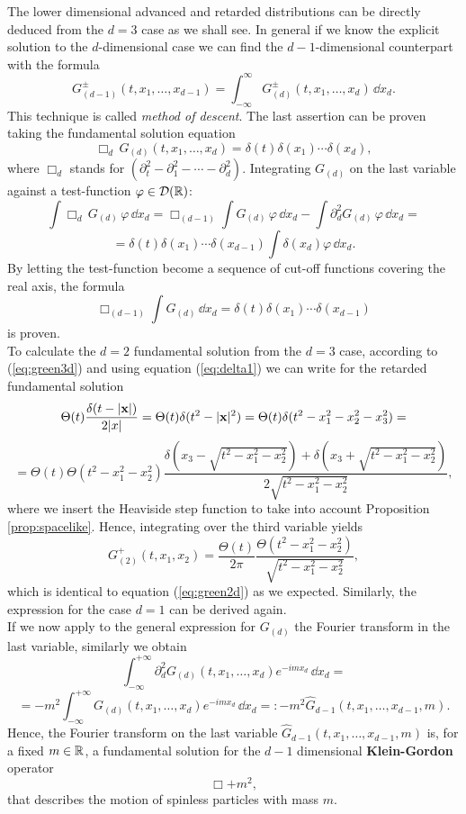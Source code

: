 	\noindent \normalsize The lower dimensional advanced and retarded distributions can be directly deduced from the $d=3$ case as we shall see. In general if we know the explicit solution to the $d$-dimensional case we can find the $d-1$-dimensional counterpart with the formula
	\[	G_{(d-1)}^{\pm}(t,x_1,\dots,x_{d-1})=\int_{-\infty}^{\infty}G_{(d)}^{\pm}(t,x_1,\dots,x_d)\,\dd x_{d}.	\]
	This technique is called \emph{method of descent}.
	The last assertion can be proven taking the fundamental solution equation
	\[\Box_d\, G_{(d)}(t,x_1,\dots,x_d)=\delta(t)\delta(x_1)\cdots\delta(x_d),\]
	where $\Box_d$ stands for $(\partial_t^2-\partial_1^2-\cdots-\partial_{d}^2)$. Integrating $G_{(d)}$ on the last variable against a test-function $\varphi\in\mathcal{D}({\mathbb R})$:
	\[	\int \Box_d\, G_{(d)}\,\varphi\,\dd x_d=	 \Box_{(d-1)}\int G_{(d)}\,\varphi\,\dd x_d-\int \partial_d^2 G_{(d)}\,\varphi\,\dd x_d=\] \[=\delta(t)\delta(x_1)\cdots\delta(x_{d-1})\int\delta(x_d)\varphi\,\dd x_d.	\]
	By letting the test-function become a sequence of cut-off functions covering the real axis, the formula
	\[	\Box_{(d-1)}\int G_{(d)}\,\dd x_d=\delta(t)\delta(x_1)\cdots\delta(x_{d-1})		\] is proven.\\
	To calculate the $d=2$ fundamental solution from the $d=3$ case, according to (\ref{eq:green3d}) and using equation (\ref{eq:delta1}) we can write for the retarded fundamental solution
	\[ \Theta(t)\frac{\delta(t-|\mathbf{x}|)}{2|x|}=\Theta(t)\delta(t^2-|\mathbf{x}|^2)=\Theta(t)\delta(t^2-x_1^2-x_2^2-x_3^2)=\] \[=\Theta(t)\Theta(t^2-x_1^2-x_2^2)\frac{\delta(x_3-\sqrt{t^2-x_1^2-x_2^2})+\delta(x_3+\sqrt{t^2-x_1^2-x_2^2})}{2\sqrt{t^2-x_1^2-x_2^2}},	\]
	where we insert the Heaviside step function to take into account Proposition \ref{prop:spacelike}. Hence, integrating over the third variable yields
	\[	G_{(2)}^{+}(t,x_1,x_2)=\frac{\Theta(t)}{2\pi}\frac{\Theta(t^2-x_1^2-x_2^2)}{\sqrt{t^2-x_1^2-x_2^2}}	,	\]
	which is identical to equation (\ref{eq:green2d}) as we expected. Similarly, the expression for the case $d=1$ can be derived again.\\
	
	If we now apply to the general expression for $G_{(d)}$ the Fourier transform in the last variable, similarly we obtain
	\[	\int_{-\infty}^{+\infty}\partial_d^2 G_{(d)}(t,x_1,\dots,x_d)e^{-im x_d}\,\dd x_d=\] \[=-m^2\int_{-\infty}^{+\infty} G_{(d)}(t,x_1,\dots,x_d)e^{-im x_d}\,\dd x_d=:-m^2\hat{G}_{d-1}(t,x_1,\dots,x_{d-1},m).	\]
	Hence, the Fourier transform on the last variable $\hat{G}_{d-1}(t,x_1,\dots,x_{d-1},m)$ is, for a fixed $m\in{\mathbb R}$, a fundamental solution for the $d-1$ dimensional \textbf{Klein-Gordon} operator
	\[	\Box+m^2,	\]
	that describes the motion of spinless particles with mass $m$.

